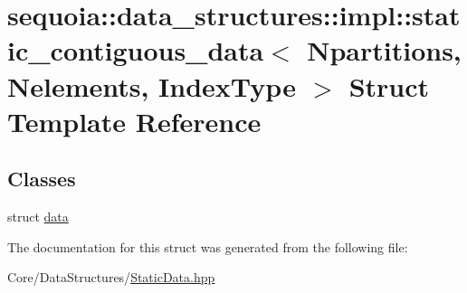 \hypertarget{structsequoia_1_1data__structures_1_1impl_1_1static__contiguous__data}{}\section{sequoia\+::data\+\_\+structures\+::impl\+::static\+\_\+contiguous\+\_\+data$<$ Npartitions, Nelements, Index\+Type $>$ Struct Template Reference}
\label{structsequoia_1_1data__structures_1_1impl_1_1static__contiguous__data}
\subsection*{Classes}
\begin{DoxyCompactItemize}
\item 
struct \mbox{\hyperlink{structsequoia_1_1data__structures_1_1impl_1_1static__contiguous__data_1_1data}{data}}
\end{DoxyCompactItemize}


The documentation for this struct was generated from the following file\+:\begin{DoxyCompactItemize}
\item 
Core/\+Data\+Structures/\mbox{\hyperlink{_static_data_8hpp}{Static\+Data.\+hpp}}\end{DoxyCompactItemize}
